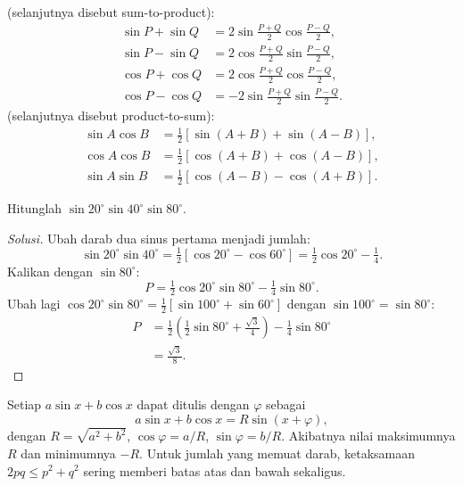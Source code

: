 \documentclass[12pt]{scrartcl}
\begin{document}
\begin{theorem}
 (selanjutnya disebut sum-to-product):
\begin{align*}
\sin P + \sin Q &= 2\sin\frac{P+Q}{2}\cos\frac{P-Q}{2}, \\
\sin P - \sin Q &= 2\cos\frac{P+Q}{2}\sin\frac{P-Q}{2}, \\
\cos P + \cos Q &= 2\cos\frac{P+Q}{2}\cos\frac{P-Q}{2}, \\
\cos P - \cos Q &= -2\sin\frac{P+Q}{2}\sin\frac{P-Q}{2}.
\end{align*}
 (selanjutnya disebut product-to-sum):
\begin{align*}
\sin A \cos B &= \tfrac12[\sin(A+B) + \sin(A-B)], \\
\cos A \cos B &= \tfrac12[\cos(A+B) + \cos(A-B)], \\
\sin A \sin B &= \tfrac12[\cos(A-B) - \cos(A+B)].
\end{align*}
\end{theorem}

\begin{example}
Hitunglah $\sin 20^{\circ} \sin 40^{\circ} \sin 80^{\circ}$.
\end{example}
\begin{proof}[Solusi]
Ubah darab dua sinus pertama menjadi jumlah:
\[ \sin 20^{\circ} \sin 40^{\circ}
= \tfrac12[\cos 20^{\circ} - \cos 60^{\circ}]
= \tfrac12\cos 20^{\circ} - \tfrac14. \]
Kalikan dengan $\sin 80^{\circ}$:
\[ P = \tfrac12\cos 20^{\circ}\sin 80^{\circ} - \tfrac14\sin 80^{\circ}. \]
Ubah lagi $\cos 20^{\circ}\sin 80^{\circ} = \tfrac12[\sin 100^{\circ} + \sin 60^{\circ}]$
dengan $\sin 100^{\circ} = \sin 80^{\circ}$:
\begin{align*}
P &= \tfrac12\left(\tfrac12\sin 80^{\circ} + \tfrac{\sqrt{3}}{4}\right)
- \tfrac14\sin 80^{\circ} \\
&= \frac{\sqrt{3}}{8}.
\end{align*}
\end{proof}

\begin{fact}
Setiap $a\sin x + b\cos x$ dapat ditulis dengan 
$\varphi$ sebagai
\[ a\sin x + b\cos x = R\sin(x+\varphi), \]
dengan $R = \sqrt{a^2+b^2}$, $\cos\varphi = a/R$, $\sin\varphi = b/R$.
Akibatnya nilai maksimumnya $R$ dan minimumnya $-R$.
Untuk jumlah yang memuat darab, ketaksamaan $2pq \le p^2 + q^2$ sering
memberi batas atas dan bawah sekaligus.
\end{fact}
\end{document}
